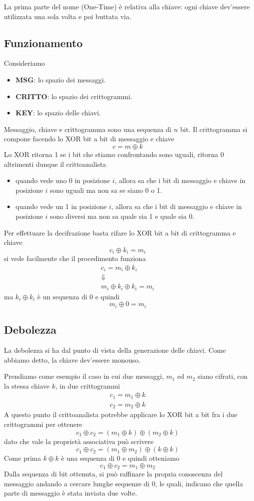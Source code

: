 La prima parte del nome (One-Time) \`e relativa alla chiave: ogni chiave dev'essere utilizzata una sola volta e poi
buttata via.

\subsection{Funzionamento}\label{funzionamento_otp}
Consideriamo
\begin{itemize}
	\item \textbf{MSG}: lo spazio dei messaggi.
	\item \textbf{CRITTO}: lo spazio dei crittogrammi.
	\item \textbf{KEY}: lo spazio delle chiavi.
\end{itemize}
Messaggio, chiave e crittogramma sono una sequenza di $n$ bit. Il crittogramma si compone facendo lo XOR bit a bit di
messaggio e chiave
\[ c = m \oplus k \]
Lo XOR ritorna 1 se i bit che stiamo confrontando sono uguali, ritorna 0 altrimenti dunque il crittoanalista
\begin{itemize}
	\item quando vede uno 0 in posizione $i$, allora sa che i bit di messaggio e chiave in posizione $i$ sono uguali
	      ma non sa se siano 0 o 1.
	\item quando vede un 1 in posizione $i$, allora sa che i bit di messaggio e chiave in posizione $i$ sono diversi
	      ma non sa quale sia 1 e quale sia 0.
\end{itemize}
Per effettuare la decifrazione basta rifare lo XOR bit a bit di crittogramma e chiave
\[ c_i \oplus k_i = m_i \]
si vede facilmente che il procedimento funziona
\begin{gather*}
	c_i = m_i \oplus k_i \\
	\Downarrow \\
	m_i \oplus k_i \oplus k_i = m_i
\end{gather*}
ma $k_i \oplus k_i$ \`e un sequenza di 0 e quindi
\[ m_i \oplus 0 = m_i \]

\subsection{Debolezza}\label{debolezza_otp}
La debolezza si ha dal punto di vista della generazione delle chiavi. Come abbiamo detto, la chiave dev'essere monouso.

Prendiamo come esempio il caso in cui due messaggi, $m_1$ ed $m_2$ siano cifrati, con la stessa chiave $k$, in due
crittogrammi
\begin{gather*}
	c_1 = m_1 \oplus k \\
	c_2 = m_2 \oplus k
\end{gather*}
A questo punto il crittoanalista potrebbe applicare lo XOR bit a bit fra i due crittogrammi per ottenere
\[ c_1 \oplus c_2 = (m_1 \oplus k) \oplus (m_2 \oplus k) \]
dato che vale la propriet\`a associativa pu\`o scrivere
\[ c_1 \oplus c_2 = (m_1 \oplus m_2) \oplus (k \oplus k) \]
Come prima $k \oplus k$ \`e una sequenza di 0 e quindi otteniamo
\[ c_1 \oplus c_2 = m_1 \oplus m_2 \]
Dalla sequenza di bit ottenuta, si pu\`o raffinare la propria conoscenza del messaggio andando a cercare lunghe sequenze
di 0, le quali, indicano che quella parte di messaggio \`e stata inviata due volte.

